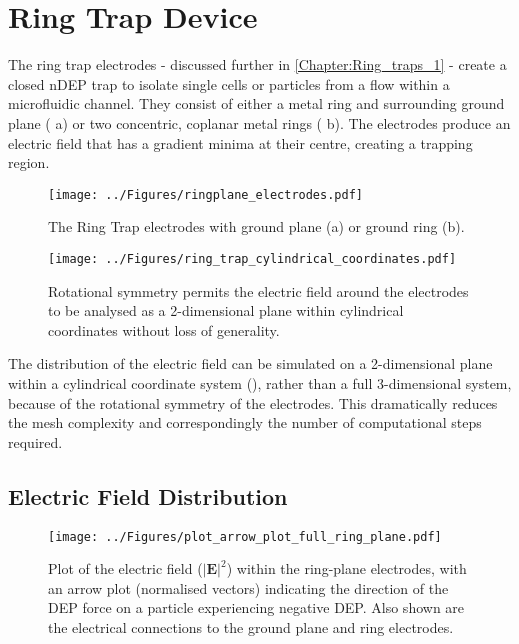  
\section{Ring Trap Device}
\label{sec:ring_trap_simulation}
The ring trap electrodes - discussed further in \cref{Chapter:Ring_traps_1} - create a closed nDEP trap to isolate single cells or particles from a flow within a microfluidic channel. They consist of either a metal ring and surrounding ground plane ( a) or two concentric, coplanar metal rings ( b). The electrodes produce an electric field that has a gradient minima at their centre, creating a trapping region. 

\begin{figure}
	\centering
		\texttt{[image: ../Figures/ringplane\_electrodes.pdf]}
	\caption[The ring trap electrodes.]{The Ring Trap electrodes with ground plane (a) or ground ring (b).}
	\label{fig:ringplanering_electrodes}
\end{figure}

\begin{figure}
 \centering
 \texttt{[image: ../Figures/ring\_trap\_cylindrical\_coordinates.pdf]}
 \caption[Cylindrical coordinates for numerical simulation.]{Rotational symmetry permits the electric field around the electrodes to be analysed as a 2-dimensional plane within cylindrical coordinates without loss of generality.}
 \label{fig:ring_trap_cylindrical_coordinates}
\end{figure}

The distribution of the electric field can be simulated on a 2-dimensional plane within a cylindrical coordinate system (), rather than a full 3-dimensional system, because of the rotational symmetry of the electrodes. This dramatically reduces the mesh complexity and correspondingly the number of computational steps required.


\subsection{Electric Field Distribution}

\begin{figure}[t]
 \centering
 \texttt{[image: ../Figures/plot\_arrow\_plot\_full\_ring\_plane.pdf]}
 \caption[Plot of the electric field and the direction of the DEP force within the ring-plane electrodes.]{Plot of the electric field ($\left | \textbf{E} \right | ^{2}$) within the ring-plane electrodes, with an arrow plot (normalised vectors) indicating the direction of the DEP force on a particle experiencing negative DEP. Also shown are the electrical connections to the ground plane and ring electrodes.}
 \label{fig:plot_arrow_plot_full_ring_plane}
\end{figure}

